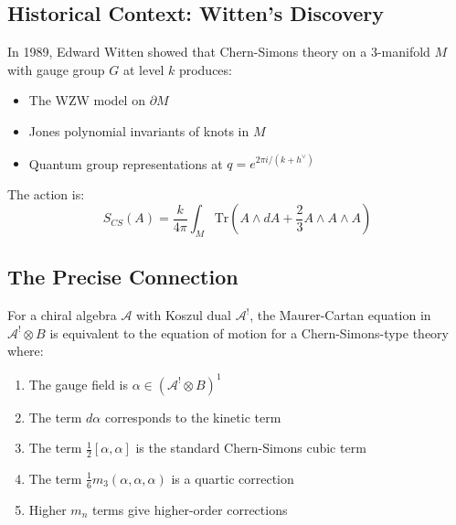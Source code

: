\subsection{Historical Context: Witten's Discovery}

In 1989, Edward Witten showed that Chern-Simons theory on a 3-manifold $M$ with gauge group $G$ at level $k$ produces:
\begin{itemize}
\item The WZW model on $\partial M$ 
\item Jones polynomial invariants of knots in $M$
\item Quantum group representations at $q = e^{2\pi i/(k+h^\vee)}$
\end{itemize}

The action is:
\[
S_{CS}(A) = \frac{k}{4\pi} \int_M \text{Tr}\left(A \wedge dA + \frac{2}{3}A \wedge A \wedge A\right)
\]

\subsection{The Precise Connection}

\begin{theorem}
For a chiral algebra $\mathcal{A}$ with Koszul dual $\mathcal{A}^!$, the Maurer-Cartan equation in $\mathcal{A}^! \otimes B$ is equivalent to the equation of motion for a Chern-Simons-type theory where:
\begin{enumerate}
\item The gauge field is $\alpha \in (\mathcal{A}^! \otimes B)^1$
\item The term $d\alpha$ corresponds to the kinetic term
\item The term $\frac{1}{2}[\alpha, \alpha]$ is the standard Chern-Simons cubic term
\item The term $\frac{1}{6}m_3(\alpha, \alpha, \alpha)$ is a quartic correction
\item Higher $m_n$ terms give higher-order corrections
\end{enumerate}
\end{theorem}

